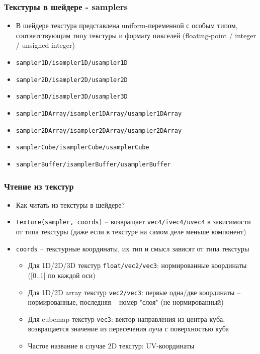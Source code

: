 \documentclass{beamer}
\begin{document}
\begin{frame}[fragile]
\frametitle{Текстуры в шейдере - samplers}
\begin{itemize}
\item В шейдере текстура представлена uniform-переменной с особым типом, соответствующим типу текстуры и формату пикселей (floating-point / integer / unsigned integer)
\pause
\item \verb|sampler1D/isampler1D/usampler1D|
\pause
\item \verb|sampler2D/isampler2D/usampler2D|
\pause
\item \verb|sampler3D/isampler3D/usampler3D|
\pause
\item \verb|sampler1DArray/isampler1DArray/usampler1DArray|
\pause
\item \verb|sampler2DArray/isampler2DArray/usampler2DArray|
\pause
\item \verb|samplerCube/isamplerCube/usamplerCube|
\pause
\item \verb|samplerBuffer/isamplerBuffer/usamplerBuffer|
\end{itemize}
\end{frame}

\begin{frame}[fragile]
\frametitle{Чтение из текстур}
\begin{itemize}
\item Как читать из текстуры в шейдере?
\pause
\item \verb|texture(sampler, coords)| -- возвращает \verb|vec4/ivec4/uvec4| в зависимости от типа текстуры (даже если в текстуре на самом деле меньше компонент)
\pause
\item \verb|coords| -- текстурные координаты, их тип и смысл зависят от типа текстуры
\pause
\begin{itemize}
\item Для 1D/2D/3D текстур \verb|float/vec2/vec3|: нормированные координаты ([0..1] по каждой оси)
\pause
\item Для 1D/2D array текстур \verb|vec2/vec3|: первые одна/две координаты -- нормированные, последняя -- номер "слоя" (не нормированный)
\pause
\item Для cubemap текстур \verb|vec3|: вектор направления из центра куба, возвращается значение из пересечения луча с поверхностью куба
\pause
\item Частое название в случае 2D текстур: UV-координаты
\end{itemize}
\end{itemize}
\end{frame}
\end{document}
